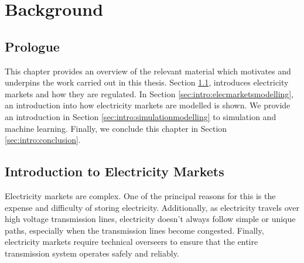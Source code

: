 
\chapter{Background}
\label{chapter:background}
\ifpdf
\graphicspath{{Chapter2/Figs/Raster/}{Chapter2/Figs/PDF/}{Chapter2/Figs/}}
\else
\graphicspath{{Chapter2/Figs/Vector/}{Chapter2/Figs/}}
\fi


\section*{Prologue}

This chapter provides an overview of the relevant material which motivates and underpins the work carried out in this thesis. Section \ref{sec:intro:elecmarkets}, introduces electricity markets and how they are regulated. In Section \ref{sec:intro:elecmarketsmodelling}, an introduction into how electricity markets are modelled is shown. We provide an introduction in Section \ref{sec:intro:simulationmodelling} to simulation and machine learning. Finally, we conclude this chapter in Section \ref{sec:intro:conclusion}.


%

\section{Introduction to Electricity Markets}
\label{sec:intro:elecmarkets}

Electricity markets are complex. One of the principal reasons for this is the expense and difficulty of storing electricity. Additionally, as electricity travels over high voltage transmission lines, electricity doesn't always follow simple or unique paths, especially when the transmission lines become congested. Finally, electricity markets require technical overseers to ensure that the entire transmission system operates safely and reliably. 


